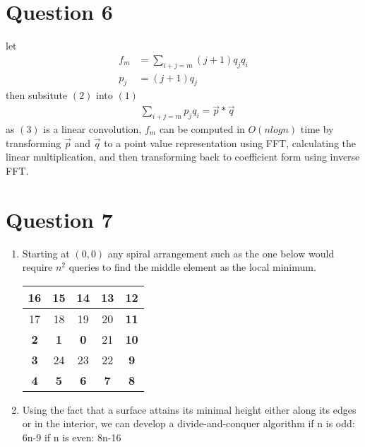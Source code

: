 \documentclass{article}
\begin{document}
\section*{Question 6}
let
\begin{align}
    f_m &= \sum_{i+j=m} (j+1)q_jq_i \\
    p_j &= (j+1)q_j
\end{align}
then subsitute $(2)$ into $(1)$
\begin{align}
    & \sum_{i+j=m} p_jq_i = \vec{p} \ast \vec{q}
\end{align}
as $(3)$ is a linear convolution, $f_m$ can be computed in $O(nlog{n})$ time by transforming $\vec{p}$ and $\vec{q}$ to a point value representation using FFT, calculating the linear multiplication, and then transforming back to coefficient form using inverse FFT.


\section*{Question 7}
\begin{enumerate}[label=\alph*)]
    \item Starting at $(0,0)$ any spiral arrangement such as the one below would require $n^2$ queries to find the middle element as the local minimum.
        \begin{center}
        \begin{tabular}{|c|c|c|c|c|}
            \hline
            \textbf{16} & \textbf{15} & \textbf{14} & \textbf{13} & \textbf{12} \\ \hline
            17          & 18          & 19          & 20          & \textbf{11} \\ \hline
            \textbf{2}  & \textbf{1}  & \textbf{0}  & 21          & \textbf{10} \\ \hline
            \textbf{3}  & 24          & 23          & 22          & \textbf{9}  \\ \hline
            \textbf{4}  & \textbf{5}  & \textbf{6}  & \textbf{7}  & \textbf{8}  \\ \hline
        \end{tabular}
        \end{center}
    \item Using the fact that a surface attains its minimal height either along its edges or in the interior, we can develop a divide-and-conquer algorithm
        if n is odd: 6n-9
        if n is even: 8n-16
\end{enumerate}
\end{document}
